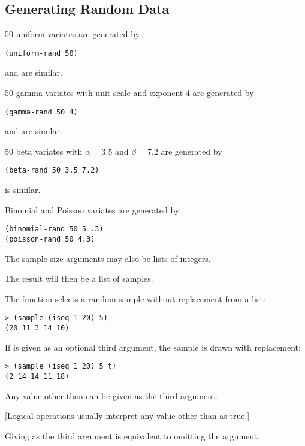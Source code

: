 \begin{slide}{}
\subsection{Generating Random Data}
50 uniform variates are generated by
\begin{verbatim}
(uniform-rand 50)
\end{verbatim}
 and  are similar.

50 gamma variates with unit scale and exponent 4 are generated by
\begin{verbatim}
(gamma-rand 50 4)
\end{verbatim}
 and  are similar.

50 beta variates with $\alpha=3.5$ and $\beta=7.2$ are generated by
\begin{verbatim}
(beta-rand 50 3.5 7.2)
\end{verbatim}
 is similar.

Binomial and Poisson variates are generated by
\begin{verbatim}
(binomial-rand 50 5 .3)
(poisson-rand 50 4.3)
\end{verbatim}
\end{slide}

\begin{slide}{}
The sample size arguments may also be lists of integers.

The result will then be a list of samples.

The function  selects a random sample without
replacement from a list:
\begin{verbatim}
> (sample (iseq 1 20) 5)
(20 11 3 14 10)
\end{verbatim}
If  is given as an optional third argument, the sample is
drawn with replacement:
\begin{verbatim}
> (sample (iseq 1 20) 5 t)
(2 14 14 11 18)
\end{verbatim}
Any value other than  can be given as the third argument.

{[Logical operations usually interpret any value other than
 as true.]}

Giving  as the third argument is equivalent to omitting
the argument.
\end{slide}


